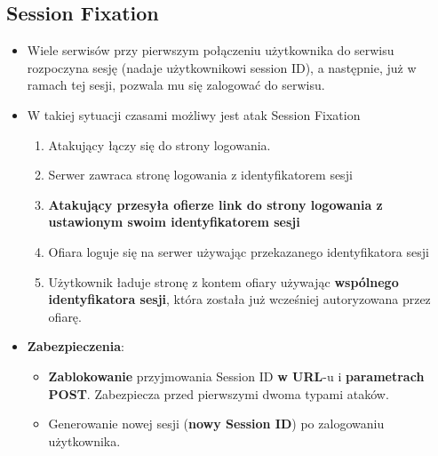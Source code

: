 \documentclass[../main.tex]{subfiles}
\begin{document}
    \subsection{Session Fixation}
    \begin{itemize}
        \item Wiele serwisów przy pierwszym połączeniu użytkownika do serwisu
        rozpoczyna sesję (nadaje użytkownikowi session ID), a następnie, już w
        ramach tej sesji, pozwala mu się zalogować do serwisu.
        \item W takiej sytuacji czasami możliwy jest atak Session Fixation
        \begin{enumerate}
            \item Atakujący łączy się do strony logowania.
            \item Serwer zawraca stronę logowania z identyfikatorem sesji
            \item \textbf{Atakujący przesyła ofierze link do strony logowania z ustawionym swoim identyfikatorem sesji}
            \item Ofiara loguje się na serwer używając przekazanego identyfikatora sesji
            \item Użytkownik ładuje stronę z kontem ofiary używając \textbf{wspólnego identyfikatora
            sesji}, która została już wcześniej autoryzowana przez ofiarę.
        \end{enumerate}
        \item \textbf{Zabezpieczenia}:
        \begin{itemize}
            \item \textbf{Zablokowanie} przyjmowania Session ID \textbf{w URL}-u i \textbf{parametrach POST}.
            Zabezpiecza przed pierwszymi dwoma typami ataków.
            \item Generowanie nowej sesji (\textbf{nowy Session ID}) po zalogowaniu użytkownika.
        \end{itemize}
    \end{itemize}
\end{document}

